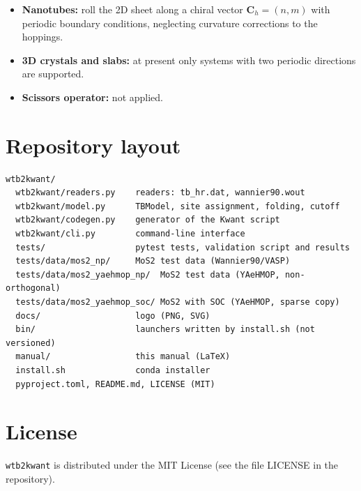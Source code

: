 \documentclass[11pt,a4paper]{article}
\newcommand{\code}[1]{{\ttfamily\def\_{\textunderscore\allowbreak}\def\slash{/\allowbreak}#1}}
\newcommand{\tool}{\texttt{wtb2kwant}}
\begin{document}
\begin{itemize}
\begin{itemize}[nosep]
                $T_{\uparrow\downarrow}$, $T_{\downarrow\uparrow}$ against an independent
                spin-resolved NEGF code (e.g.\ TBtrans) on the same Hamiltonian;
          \item the sensitivity of the SOC split to the position of the lead interface
                (lead supercell, scattering-region length); with \code{modes} it should
                not depend on it;
          \item physical spin flip from scattering rather than from the lead modes: SOC
                ribbons with defects or disorder, or a Rashba term from an out-of-plane
                field;
          \item spin-resolved currents beyond the rigid band, once a bias-dependent
                potential is implemented.
        \end{itemize}
  \item \textbf{Nanotubes:} roll the 2D sheet along a chiral vector $\mathbf{C}_h=(n,m)$
        with periodic boundary conditions, neglecting curvature corrections to the
        hoppings.
  \item \textbf{3D crystals and slabs:} at present only systems with two periodic
        directions are supported.
  \item \textbf{Scissors operator:} not applied.
\end{itemize}

\appendix
\section{Repository layout}
\begin{lstlisting}
wtb2kwant/
  wtb2kwant/readers.py    readers: tb_hr.dat, wannier90.wout
  wtb2kwant/model.py      TBModel, site assignment, folding, cutoff
  wtb2kwant/codegen.py    generator of the Kwant script
  wtb2kwant/cli.py        command-line interface
  tests/                  pytest tests, validation script and results
  tests/data/mos2_np/     MoS2 test data (Wannier90/VASP)
  tests/data/mos2_yaehmop_np/  MoS2 test data (YAeHMOP, non-orthogonal)
  tests/data/mos2_yaehmop_soc/ MoS2 with SOC (YAeHMOP, sparse copy)
  docs/                   logo (PNG, SVG)
  bin/                    launchers written by install.sh (not versioned)
  manual/                 this manual (LaTeX)
  install.sh              conda installer
  pyproject.toml, README.md, LICENSE (MIT)
\end{lstlisting}

\section{License}
\tool{} is distributed under the MIT License (see the file \code{LICENSE} in the repository).
\end{document}

